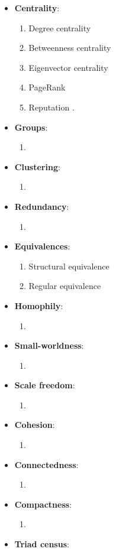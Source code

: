 \documentclass[12pt, a4paper]{article}
\begin{document}
	\begin{itemize}
		\item \textbf{Centrality}:
			\begin{enumerate}
				\item Degree centrality
				\item Betweenness centrality
				\item Eigenvector centrality
				\item PageRank
				\item Reputation \cite{Beskow2020FriendBot}.
			\end{enumerate}
		\item \textbf{Groups}:
			\begin{enumerate}
				\item 
			\end{enumerate}
		\item \textbf{Clustering}:
			\begin{enumerate}
				\item 
			\end{enumerate}
		\item \textbf{Redundancy}:
			\begin{enumerate}
				\item 
			\end{enumerate}
		\item \textbf{Equivalences}:
			\begin{enumerate}
				\item Structural equivalence
				\item Regular equivalence
			\end{enumerate}
		\item \textbf{Homophily}:
			\begin{enumerate}
				\item 	
			\end{enumerate}
		\item \textbf{Small-worldness}:
			\begin{enumerate}
				\item 	
			\end{enumerate}
		\item \textbf{Scale freedom}:
			\begin{enumerate}
				\item 	
			\end{enumerate}
		\item \textbf{Cohesion}:
			\begin{enumerate}
				\item 	
			\end{enumerate}
		\item \textbf{Connectedness}:
			\begin{enumerate}
				\item 	
			\end{enumerate}
		\item \textbf{Compactness}:
			\begin{enumerate}
				\item 	
			\end{enumerate}
		\item \textbf{Triad census}:
			

\end{itemize}
\end{document}
